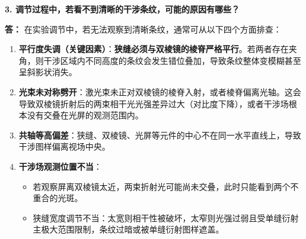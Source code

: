 \documentclass[]{../../templates/Report}%
\begin{document}
\begin{fullreportonly}
\medskip
\textbf{3. 调节过程中，若看不到清晰的干涉条纹，可能的原因有哪些？}

\noindent\textbf{答：}
在实验调节中，若无法观察到清晰条纹，通常可从以下四个方面排查：
\begin{enumerate}
    \item \textbf{平行度失调（关键因素）}：\textbf{狭缝必须与双棱镜的棱脊严格平行}。若两者存在夹角，则干涉区域内不同高度的条纹会发生错位叠加，导致条纹整体变模糊甚至呈斜影状消失。
    \item \textbf{光束未对称劈开}：激光束未正对双棱镜的棱脊入射，或者棱脊偏离光轴。这会导致双棱镜折射后的两束相干光光强差异过大（对比度下降），或者干涉场根本没有交叠在光屏的观测范围内。
    \item \textbf{共轴等高偏差}：狭缝、双棱镜、光屏等元件的中心不在同一水平直线上，导致干涉图样偏离视场中央。
    \item \textbf{干涉场观测位置不当}：
    \begin{itemize}
        \item 若观察屏离双棱镜太近，两束折射光可能尚未交叠，此时只能看到两个不重合的光斑。
        \item 狭缝宽度调节不当：太宽则相干性被破坏，太窄则光强过弱且受单缝衍射主极大范围限制，条纹过暗或被单缝衍射图样遮盖。
    \end{itemize}
\end{enumerate}

\end{fullreportonly}
\insertnotes
\end{document}

